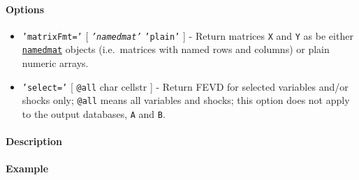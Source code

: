 \paragraph{Options}

\begin{itemize}
\item
  \texttt{'matrixFmt='} {[} \emph{\texttt{'namedmat'}} \textbar{}
  \texttt{'plain'} {]} - Return matrices \texttt{X} and \texttt{Y} as be
  either \href{namedmat/Contents}{\texttt{namedmat}} objects
  (i.e.~matrices with named rows and columns) or plain numeric arrays.
\item
  \texttt{'select='} {[} \texttt{@all} \textbar{} char \textbar{}
  cellstr {]} - Return FEVD for selected variables and/or shocks only;
  \texttt{@all} means all variables and shocks; this option does not
  apply to the output databases, \texttt{A} and \texttt{B}.
\end{itemize}

\paragraph{Description}

\paragraph{Example}


